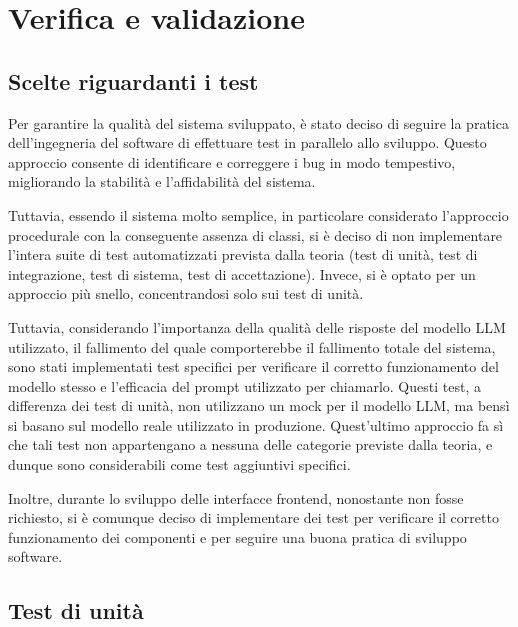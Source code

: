 \chapter{Verifica e validazione}
\label{cap:verifica-validazione}



\section{Scelte riguardanti i test}

Per garantire la qualità del sistema sviluppato, è stato deciso di seguire la pratica dell'ingegneria del software di effettuare test in parallelo allo sviluppo. Questo approccio consente di identificare e correggere i bug in modo tempestivo, migliorando la stabilità e l'affidabilità del sistema.

Tuttavia, essendo il sistema molto semplice, in particolare considerato l'approccio procedurale con la conseguente assenza di classi, si è deciso di non implementare l'intera suite di test automatizzati prevista dalla teoria (test di unità, test di integrazione, test di sistema, test di accettazione). Invece, si è optato per un approccio più snello, concentrandosi solo sui test di unità.

Tuttavia, considerando l'importanza della qualità delle risposte del modello LLM utilizzato, il fallimento del quale comporterebbe il fallimento totale del sistema, sono stati implementati test specifici per verificare il corretto funzionamento del modello stesso e l'efficacia del prompt utilizzato per chiamarlo. Questi test, a differenza dei test di unità, non utilizzano un mock per il modello LLM, ma bensì si basano sul modello reale utilizzato in produzione. Quest'ultimo approccio fa sì che tali test non appartengano a nessuna delle categorie previste dalla teoria, e dunque sono considerabili come test aggiuntivi specifici.

Inoltre, durante lo sviluppo delle interfacce frontend, nonostante non fosse richiesto, si è comunque deciso di implementare dei test per verificare il corretto funzionamento dei componenti e per seguire una buona pratica di sviluppo software.


\section{Test di unità}

